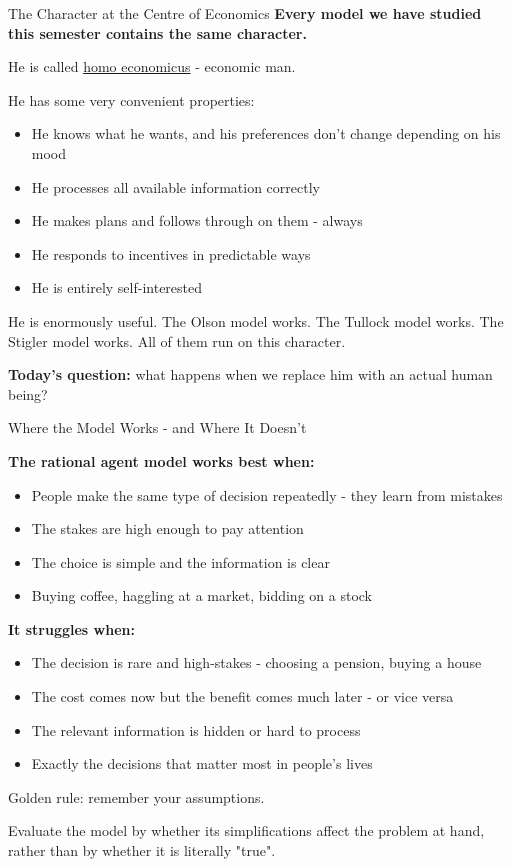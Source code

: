\documentclass[10pt]{beamer}
\begin{document}
\begin{frame}[allowframebreaks]{The Character at the Centre of Economics}
\textbf{Every model we have studied this semester contains the same character.}


He is called \alert{\href{https://nicholasdecker.substack.com/}{homo economicus}} - economic man.


He has some very convenient properties:
\begin{itemize}
\item He knows what he wants, and his preferences don't change depending on his mood
\item He processes all available information correctly
\item He makes plans and follows through on them - always
\item He responds to incentives in predictable ways
\item He is entirely self-interested
\end{itemize}


\alert{He is enormously useful.}
The Olson model works. The Tullock model works. The Stigler model works.
All of them run on this character.


\textbf{Today's question:} what happens when we replace him with an actual human being?
\end{frame}


\begin{frame}{Where the Model Works - and Where It Doesn't}

\textbf{The rational agent model works best when:}
\begin{itemize}
\item People make the same type of decision repeatedly - they learn from mistakes
\item The stakes are high enough to pay attention
\item The choice is simple and the information is clear
\item[\footnotesize$\triangleright$] \footnotesize Buying coffee, haggling at a market, bidding on a stock
\end{itemize}


\textbf{It struggles when:}
\begin{itemize}
\item The decision is \alert{rare and high-stakes} - choosing a pension, buying a house
\item The cost comes now but the benefit comes much later - or vice versa
\item The relevant information is hidden or hard to process
\item[\footnotesize$\triangleright$] \footnotesize Exactly the decisions that matter most in people's lives
\end{itemize}


\alert{Golden rule:} remember your assumptions.

Evaluate the model by whether its simplifications affect the problem at hand, rather than by whether it is literally "true".
\end{frame}
\end{document}
